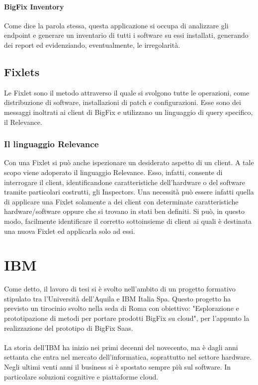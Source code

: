 \paragraph{BigFix Inventory}
Come dice la parola stessa, questa applicazione si occupa di analizzare gli endpoint e generare un inventario di tutti i software su essi installati, generando dei report ed evidenziando, eventualmente, le irregolarità.

\subsection{Fixlets}
Le Fixlet sono il metodo attraverso il quale si svolgono tutte le operazioni, come distribuzione di software, installazioni di patch e configurazioni. Esse sono dei messaggi inoltrati ai client di BigFix e utilizzano un linguaggio di query specifico, il Relevance.
\subsubsection{Il linguaggio Relevance}
Con una Fixlet si può anche ispezionare un desiderato aspetto di un client. A tale scopo viene adoperato il linguaggio Relevance. Esso, infatti, consente di interrogare il client, identificandone caratteristiche dell'hardware o del software tramite particolari costrutti, gli Inspectors. Una necessità può essere infatti quella di applicare una Fixlet solamente a dei client con determinate caratteristiche hardware/software oppure che si trovano in stati ben definiti. Si può, in questo modo, facilmente identificare il corretto sottoinsieme di client ai quali è destinata una nuova Fixlet ed applicarla solo ad essi.

\section{IBM}
Come detto, il lavoro di tesi si è svolto nell'ambito di un progetto formativo stipulato tra l'Università dell'Aquila e IBM Italia Spa. Questo progetto ha previsto un tirocinio svolto nella seda di Roma con obiettivo: "Esplorazione e prototipazione di metodi per portare prodotti BigFix su cloud", per l'appunto la realizzazione del prototipo di BigFix Saas. 
\paragraph{}
La storia dell'IBM ha inizio nei primi decenni del novecento, ma è dagli anni settanta che entra nel mercato dell'informatica, soprattutto nel settore hardware. Negli ultimi venti anni il business si è spostato sempre più sul software. In particolare soluzioni cognitive e piattaforme cloud.
